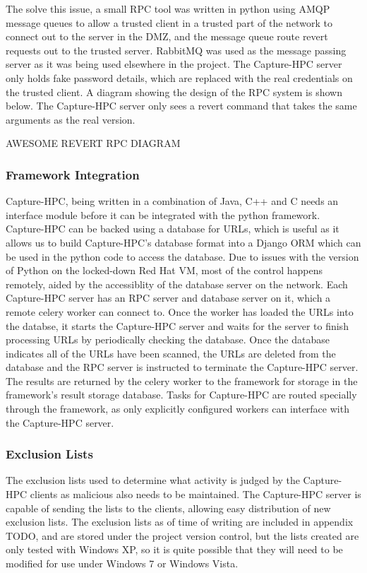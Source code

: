 The solve this issue, a small RPC tool was written in python using AMQP message
 queues to
allow a trusted client in a trusted part of the network to connect out to the
server in the DMZ, and the message queue route revert requests out to the
trusted server. RabbitMQ was used as the message passing server as it was being
used elsewhere in the project. The Capture-HPC server only holds fake password details, which
are replaced with the real credentials on the trusted client. A diagram showing
the design of the RPC system is shown below. The Capture-HPC server only sees a
revert command that takes the same arguments as the real version. 

AWESOME REVERT RPC DIAGRAM

\subsubsection{Framework Integration}

Capture-HPC, being written in a combination of Java, C++ and C needs an
interface module before it can be integrated with the python framework.
Capture-HPC can be backed using a database for URLs, which is useful as it
allows us to build Capture-HPC's database format into a Django ORM which can
be used in the python code to access the database. Due to issues with the
version of Python on the locked-down Red Hat VM, most of the control happens
remotely, aided by the accessiblity of the database server on the network. Each
Capture-HPC server has an RPC server and database server on it, which a remote
celery worker can connect to. Once the worker has loaded the URLs into the
databse, it starts the Capture-HPC server and waits for the server to finish
processing URLs by periodically checking the database. Once the database
indicates all of the URLs have been scanned, the URLs are deleted from the
database and the RPC server is instructed to terminate the Capture-HPC server.
The results are returned by the celery worker to the framework for storage in
the framework's result storage database. Tasks for Capture-HPC are routed
specially through the framework, as only explicitly configured workers can
interface with the Capture-HPC server.

\subsubsection{Exclusion Lists}

The exclusion lists used to determine what activity is judged by the Capture-HPC
clients as malicious also needs to be maintained. The Capture-HPC server is
capable of sending the lists to the clients, allowing easy distribution of new
exclusion lists. The exclusion lists as of time of writing are included in
appendix TODO, and are stored under the project version control, but the lists
created are only tested with Windows XP, so it is quite possible that they will
need to be modified for use under Windows 7 or Windows Vista.

